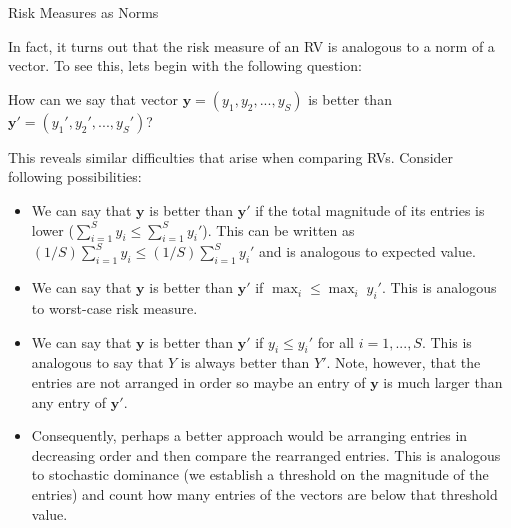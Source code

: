 \documentclass[9pt]{beamer}
\begin{document}
%
\begin{frame}{Risk Measures as Norms}

In fact, it turns out that the risk measure of an RV is analogous to a norm of a vector. To see this, lets begin with the following question:
\begin{block}{}
How can we say that vector $\mathbf{y}=(y_1,y_2,...,y_S)$ is better than $\mathbf{y}'=(y_1',y_2',...,y_S')$?
\end{block}
This reveals similar difficulties that arise when comparing RVs. Consider following possibilities:
\begin{itemize}

\item We can say that $\mathbf{y} $ is better than $\mathbf{y}'$ if the total magnitude of its entries is lower ($\sum_{i=1}^Sy_i\leq \sum_{i=1}^Sy_i'$). This can be written as $(1/S)\sum_{i=1}^Sy_i\leq (1/S)\sum_{i=1}^Sy_i'$  and is analogous to expected value.

\item We can say that $\mathbf{y} $ is better than $\mathbf{y}'$ if $\max_i\leq \max_i\; y_i'$. This is analogous to worst-case risk measure. 

\item  We can  say that $\mathbf{y}$ is better than $\mathbf{y}'$ if $y_i\leq y_i'$ for all $i=1,...,S$. This is analogous to say that $Y$ is always better than $Y'$.  Note, however, that the entries are not arranged in order so maybe an entry of $\mathbf{y}$ is much larger than any entry of $\mathbf{y}'$.  

\item Consequently, perhaps a better approach would be arranging entries in decreasing order and then compare the rearranged entries.  This is analogous to stochastic dominance (we establish a threshold on the magnitude of the entries) and count how many entries of the vectors are below that threshold value.  

\end{itemize}



\end{frame}
\end{document}
